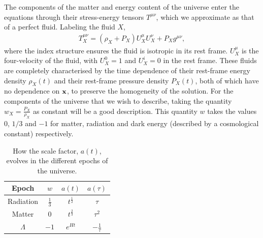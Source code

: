     The components of the matter and energy content of the universe enter the equations through
    their stress-energy tensors $T^{\mu\nu}$, which we approximate as that of
    a perfect fluid. Labeling the fluid $X$,
    \begin{align}\label{stress_tensor}
        T_X^{\mu\nu} = (\rho_X+P_X)U_X^\mu U_X^\nu+P_Xg^{\mu\nu},
    \end{align}
    where the index structure ensures the fluid is isotropic in its rest frame.
    $U_X^\mu$ is the four-velocity of the fluid, with $U_X^0=1$ and $U_X^i=0$
    in the rest frame.
    These fluids are completely characterised by the time dependence
    of their rest-frame energy density $\rho_X(t)$ and their rest-frame
    pressure density $P_X(t)$,
    both of which have no dependence on $\mathbf{x}$, to preserve the homogeneity of the solution.
    For the components of the universe that we wish to describe,
    taking the quantity $w_X=\frac{P_X}{\rho_X}$ as constant will be a good description.
    This quantity $w$ takes the values $0$, $1/3$ and $-1$ for matter, radiation
    and dark energy (described by a cosmological constant) respectively.


    \begin{table}[h!]
    \begin{center}
        \begin{tabular}{ c c c c }
            Epoch & $w$ & $a(t)$ & $a(\tau)$ \\ 
            \toprule
            Radiation & $\frac{1}{3}$ & $t^{\frac{1}{2}}$ & $\tau$ \\
            Matter & $0$ & $t^{\frac{2}{3}}$ & $\tau^2$ \\
            $\Lambda$ & $-1$ & $e^{Ht}$ & $-\frac{1}{\tau}$
        \end{tabular}\caption{
            How the scale factor, $a(t)$, evolves in the
            different epochs of the universe.
        }\label{lcdm_dep_table}
    \end{center}
    \end{table}


